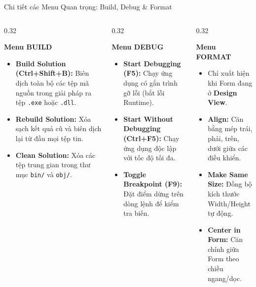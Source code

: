 \documentclass[aspectratio=169, 10pt]{beamer}
\begin{document}
\begin{frame}{Chi tiết các Menu Quan trọng: Build, Debug \& Format}
  \begin{columns}[T]
    \begin{column}{0.32\textwidth}
      \begin{block}{\textbf{Menu BUILD}}
        \begin{itemize}\footnotesize
          \item \textbf{Build Solution (Ctrl+Shift+B):} Biên dịch toàn bộ các tệp mã nguồn trong giải pháp ra tệp \texttt{.exe} hoặc \texttt{.dll}.
          \item \textbf{Rebuild Solution:} Xóa sạch kết quả cũ và biên dịch lại từ đầu mọi tệp tin.
          \item \textbf{Clean Solution:} Xóa các tệp trung gian trong thư mục \texttt{bin/} và \texttt{obj/}.
        \end{itemize}
      \end{block}
    \end{column}

    \begin{column}{0.32\textwidth}
      \begin{block}{\textbf{Menu DEBUG}}
        \begin{itemize}\footnotesize
          \item \textbf{Start Debugging (F5):} Chạy ứng dụng có gắn trình gỡ lỗi (bắt lỗi Runtime).
          \item \textbf{Start Without Debugging (Ctrl+F5):} Chạy ứng dụng độc lập với tốc độ tối đa.
          \item \textbf{Toggle Breakpoint (F9):} Đặt điểm dừng trên dòng lệnh để kiểm tra biến.
        \end{itemize}
      \end{block}
    \end{column}

    \begin{column}{0.32\textwidth}
      \begin{exampleblock}{\textbf{Menu FORMAT}}
        \begin{itemize}\footnotesize
          \item Chỉ xuất hiện khi Form đang ở \textbf{Design View}.
          \item \textbf{Align:} Căn bằng mép trái, phải, trên, dưới giữa các điều khiển.
          \item \textbf{Make Same Size:} Đồng bộ kích thước Width/Height tự động.
          \item \textbf{Center in Form:} Căn chính giữa Form theo chiều ngang/dọc.
        \end{itemize}
      \end{exampleblock}
    \end{column}
  \end{columns}
\end{frame}
\end{document}
